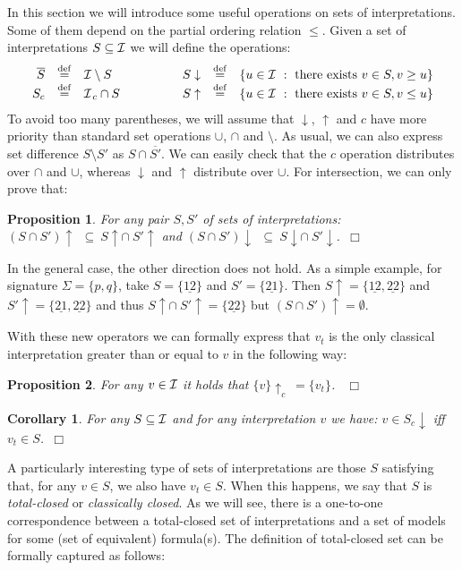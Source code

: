 \documentclass{tlp}
\newcommand{\eqdef}{\mathbin{\stackrel{\mathrm{def}}{=}}}
\def\cI{{\cal I}}
\def\cIc{{\cal I}_{\, c}}
\def\down{\downarrow}
\def\up{\uparrow}
\newcommand\non[1]{\overline{#1} }
\def\qed{~\hfill$\Box$}
\newtheorem{corollary}{Corollary}
\newtheorem{proposition}{Proposition}
\newcommand{\str}[1]{\underline{#1}}
\begin{document}
In this section we will introduce some useful operations on sets of interpretations. Some of them depend on the partial ordering relation $\leq$. Given a set of interpretations $S\subseteq \cI$ we will define the operations:
\[
\begin{array}{rcl@{\hspace{50pt}}rcl}
\non{S} & \eqdef & \cI \setminus S &
S \down & \eqdef & \{u \in \cI \ : \ \hbox{there exists } v \in S, v \geq u\} \\
S_c & \eqdef & \cIc \cap S &
S \up & \eqdef & \{u \in \cI \ : \ \hbox{there exists } v \in S, v \leq u\} 
\end{array}
\]
To avoid too many parentheses, we will assume that $\down$, $\up$ and $c$ have more priority than standard set operations $\cup$, $\cap$ and $\setminus$. As usual, we can also express set difference $S \setminus S'$ as $S \cap \non{S'}$. We can easily check that the $c$ operation distributes over $\cap$ and $\cup$, whereas $\down$ and $\up$ distribute over $\cup$. For intersection, we can only prove that:

\begin{proposition}\label{prop:distr} 
For any pair $S, S'$ of sets of interpretations: \\
$(S \cap S')\up \ \ \subseteq \ S\up \cap \ S'\up$ and $(S \cap S')\down \ \ \subseteq \ S\down \cap \ S'\down$.\qed
\end{proposition}

\noindent In the general case, the other direction does not hold. As a simple example, for signature $\Sigma=\{p,q\}$, take $S=\{\str{12}\}$ and $S'=\{\str{21}\}$. Then $S\up = \{\str{12},\str{22}\}$ and $S'\up =\{\str{21},\str{22}\}$ and thus $S\up \cap \ S'\up=\{\str{22}\}$ but $(S\cap S')\up = \emptyset$.

With these new operators we can formally express that $v_t$ is the only classical interpretation greater than or equal to $v$ in the following way:

\begin{proposition}\label{prop:vt} 
For any $v \in \cI$ it holds that $\{v\} \up_c \ = \{ v_t \}$. \qed
\end{proposition}
\begin{corollary}\label{cor:vt} 
For any $S \subseteq \cI$ and for any interpretation $v$ we have: $v \in S_c \down$ iff $v_t \in S$.\qed
\end{corollary}

A particularly interesting type of sets of interpretations are those $S$ satisfying that, for any $v \in S$, we also have $v_t \in S$. When this happens, we say that $S$ is \emph{total-closed} or \emph{classically closed}. As we will see, there is a one-to-one correspondence between a total-closed set of interpretations and a set of models for some (set of equivalent) formula(s). The definition of total-closed set can be formally captured as follows:
\end{document}
